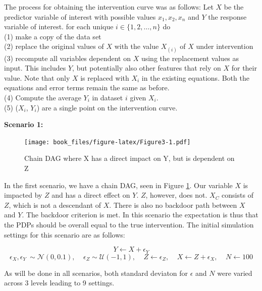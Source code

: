 \documentclass[]{krantz}
\begin{document}
The process for obtaining the intervention curve was as follows: Let
\(X\) be the predictor variable of interest with possible values
\(x_{1}, x_{2}, x_{n}\) and \(Y\) the response variable of interest. for
each unique \(i \in \{1,2,\dots,n\}\) do\\
(1) make a copy of the data set\\
(2) replace the original values of \(X\) with the value \(X_{(i)}\) of
\(X\) under intervention\\
(3) recompute all variables dependent on \(X\) using the replacement
values as input. This includes \(Y\), but potentially also other
features that rely on \(X\) for their value. Note that only \(X\) is
replaced with \(X_i\) in the existing equations. Both the equations and
error terms remain the same as before.\\
(4) Compute the average \(Y_i\) in dataset \(i\) given \(X_i\).\\
(5) (\(X_i\), \(Y_i\)) are a single point on the intervention curve.

\textbf{Scenario 1: }

\begin{figure}
\centering
\texttt{[image: book\_files/figure-latex/Figure3-1.pdf]}
\caption{\label{fig:Figure3}Chain DAG where X has a direct impact on Y, but
is dependent on Z}
\end{figure}

In the first scenario, we have a chain DAG, seen in Figure
\ref{fig:Figure3}. Our variable \(X\) is impacted by \(Z\) and has a
direct effect on \(Y\). \(Z\), however, does not. \(X_C\) consists of
\(Z\), which is not a descendant of \(X\). There is also no backdoor
path between \(X\) and \(Y\). The backdoor criterion is met. In this
scenario the expectation is thus that the PDPs should be overall equal
to the true intervention. The initial simulation settings for this
scenario are as follows:

\[ Y \leftarrow X + \epsilon_Y  \]
\[ \epsilon_X,\epsilon_Y ~ \sim \mathcal{N}(0, 0.1), \ \ \ \ \ \epsilon_Z \sim \mathcal{U}(-1,1),\ \ \ \ \ Z \leftarrow \epsilon_Z, \ \ \ \ \ X \leftarrow Z + \epsilon_X, \ \ \ \ \ N \leftarrow 100 \]

As will be done in all scenarios, both standard deviaton for
\(\epsilon\) and \(N\) were varied across 3 levels leading to 9
settings.
\end{document}
